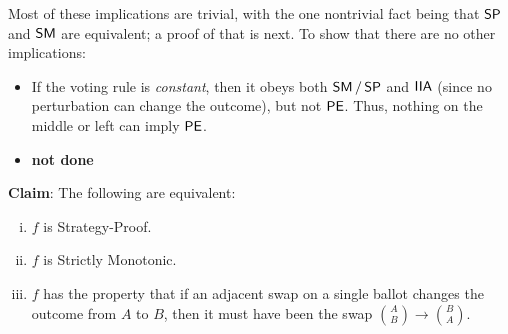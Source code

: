 \documentclass{amsart}
\DeclareMathOperator{\PE}{\sf{PE}}
\DeclareMathOperator{\IIA}{\sf{IIA}}
\DeclareMathOperator{\SP}{\sf{SP}}
\DeclareMathOperator{\SM}{\sf{SM}}
\begin{document}
Most of these implications are trivial, with the one nontrivial fact being that $\SP$ and $\SM$ are equivalent; a proof of that is next. To show that there are no other implications:
\begin{itemize}
	\item If the voting rule is \textit{constant}, then it obeys both $\SM / \SP$ and $\IIA$ (since no perturbation can change the outcome), but not $\PE$. Thus, nothing on the middle or left can imply $\PE$.
	\item \textbf{not done}\\
\end{itemize}

\textbf{Claim}: The following are equivalent:
\begin{enumerate}[(i)]
	\item $f$ is Strategy-Proof.
	\item $f$ is Strictly Monotonic.
	\item $f$ has the property that if an adjacent swap on a single ballot changes the outcome from $A$ to $B$, then it must have been the swap ${A\choose B}\to {B \choose A}$.
\end{enumerate}
\end{document}
